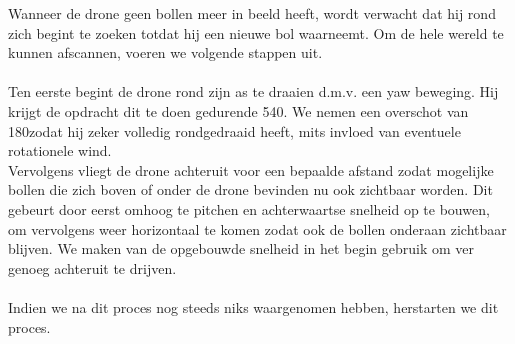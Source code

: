 \noindent
Wanneer de drone geen bollen meer in beeld heeft, wordt verwacht dat hij rond zich begint te zoeken totdat hij een nieuwe bol waarneemt. Om de hele wereld te kunnen afscannen, voeren we volgende stappen uit.
\\
\\
Ten eerste begint de drone rond zijn as te draaien d.m.v. een yaw beweging. Hij krijgt de opdracht dit te doen gedurende 540\degree. We nemen een overschot van 180\degree  zodat hij zeker volledig rondgedraaid heeft, mits invloed van eventuele rotationele wind.
\\
Vervolgens vliegt de drone achteruit voor een bepaalde afstand zodat mogelijke bollen die zich boven of onder de drone bevinden nu ook zichtbaar worden. Dit gebeurt door eerst omhoog te pitchen en achterwaartse snelheid op te bouwen, om vervolgens weer horizontaal te komen zodat ook de bollen onderaan zichtbaar blijven. We maken van de opgebouwde snelheid in het begin gebruik om ver genoeg achteruit te drijven.
\\
\\
Indien we na dit proces nog steeds niks waargenomen hebben, herstarten we dit proces. 